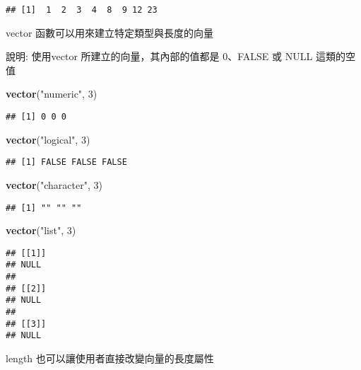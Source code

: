 \documentclass[
]{article}
\newenvironment{Shaded}{\begin{snugshade}}{\end{snugshade}}
\newcommand{\DecValTok}[1]{\textcolor[rgb]{0.00,0.00,0.81}{#1}}
\newcommand{\KeywordTok}[1]{\textcolor[rgb]{0.13,0.29,0.53}{\textbf{#1}}}
\newcommand{\NormalTok}[1]{#1}
\newcommand{\StringTok}[1]{\textcolor[rgb]{0.31,0.60,0.02}{#1}}
\begin{document}
\begin{verbatim}
## [1]  1  2  3  4  8  9 12 23
\end{verbatim}

vector 函數可以用來建立特定類型與長度的向量

說明: 使用vector 所建立的向量，其內部的值都是 0、FALSE 或 NULL
這類的空值

\begin{Shaded}
\begin{Highlighting}[]
\KeywordTok{vector}\NormalTok{(}\StringTok{"numeric"}\NormalTok{, }\DecValTok{3}\NormalTok{)}
\end{Highlighting}
\end{Shaded}

\begin{verbatim}
## [1] 0 0 0
\end{verbatim}

\begin{Shaded}
\begin{Highlighting}[]
\KeywordTok{vector}\NormalTok{(}\StringTok{"logical"}\NormalTok{, }\DecValTok{3}\NormalTok{)}
\end{Highlighting}
\end{Shaded}

\begin{verbatim}
## [1] FALSE FALSE FALSE
\end{verbatim}

\begin{Shaded}
\begin{Highlighting}[]
\KeywordTok{vector}\NormalTok{(}\StringTok{"character"}\NormalTok{, }\DecValTok{3}\NormalTok{)}
\end{Highlighting}
\end{Shaded}

\begin{verbatim}
## [1] "" "" ""
\end{verbatim}

\begin{Shaded}
\begin{Highlighting}[]
\KeywordTok{vector}\NormalTok{(}\StringTok{"list"}\NormalTok{, }\DecValTok{3}\NormalTok{)}
\end{Highlighting}
\end{Shaded}

\begin{verbatim}
## [[1]]
## NULL
## 
## [[2]]
## NULL
## 
## [[3]]
## NULL
\end{verbatim}

length 也可以讓使用者直接改變向量的長度屬性
\end{document}

